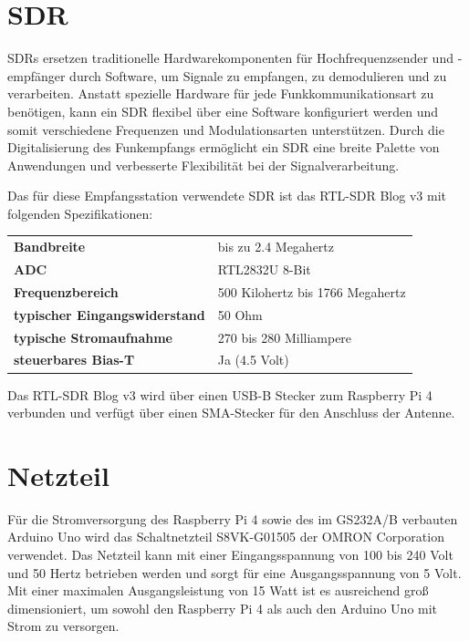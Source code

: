 \section{SDR}
\label{sec:sdr}
SDRs ersetzen traditionelle Hardwarekomponenten für Hochfrequenzsender und -empfänger durch Software, um Signale zu empfangen, zu demodulieren und zu verarbeiten. Anstatt spezielle Hardware für jede Funkkommunikationsart zu benötigen, kann ein SDR flexibel über eine Software konfiguriert werden und somit verschiedene Frequenzen und Modulationsarten unterstützen. Durch die Digitalisierung des Funkempfangs ermöglicht ein SDR eine breite Palette von Anwendungen und verbesserte Flexibilität bei der Signalverarbeitung. \cite{noauthor_sdr_nodate}

Das für diese Empfangsstation verwendete SDR ist das RTL-SDR Blog v3 mit folgenden Spezifikationen:
\begin{table}[H]
	\centering
	\begin{tabular}{ll}
		\textbf{Bandbreite} & bis zu 2.4 Megahertz \\
		\textbf{ADC} & RTL2832U 8-Bit \\
		\textbf{Frequenzbereich} & 500 Kilohertz bis 1766 Megahertz \\
		\textbf{typischer Eingangswiderstand} & 50 Ohm \\
		\textbf{typische Stromaufnahme} & 270 bis 280 Milliampere \\
		\textbf{steuerbares Bias-T} & Ja (4.5 Volt) \\
	\end{tabular}
\end{table}

Das RTL-SDR Blog v3 wird über einen USB-B Stecker zum Raspberry Pi 4 verbunden und verfügt über einen SMA-Stecker für den Anschluss der Antenne. \cite{noauthor_rtl-sdr_nodate}

\section{Netzteil}
\label{sec:Netzteil}
Für die Stromversorgung des Raspberry Pi 4 sowie des im GS232A/B verbauten Arduino Uno wird das Schaltnetzteil S8VK-G01505 der OMRON Corporation verwendet. Das Netzteil kann mit einer Eingangsspannung von 100 bis 240 Volt und 50 Hertz betrieben werden und sorgt für eine Ausgangsspannung von 5 Volt. Mit einer maximalen Ausgangsleistung von 15 Watt ist es ausreichend groß dimensioniert, um sowohl den Raspberry Pi 4 \cite{noauthor_power_nodate} als auch den Arduino Uno \cite{noauthor_r3_nodate} mit Strom zu versorgen. \cite{noauthor_s8vk-g01505_nodate}

